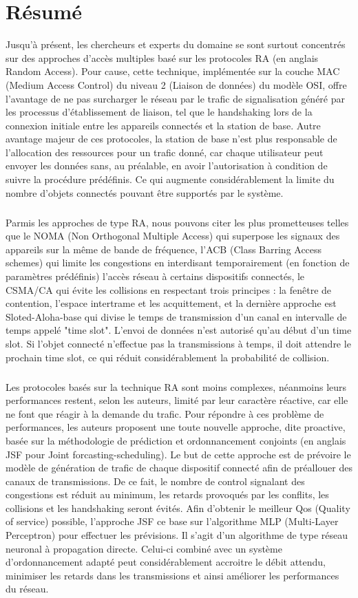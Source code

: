 \documentclass[12pt]{article}
\begin{document}
\section{Résumé}
Jusqu'à présent, les chercheurs et experts du domaine se sont surtout concentrés sur des approches d'accès multiples basé sur les protocoles RA (en anglais Random Access). 
Pour cause, cette technique, implémentée sur la couche MAC (Medium Access Control) du niveau 2 (Liaison de données) du modèle OSI, offre l'avantage de ne pas surcharger le réseau par le trafic de signalisation généré par les processus d'établissement de liaison, tel que le handshaking lors de la connexion initiale entre les appareils connectés et la station de base.
Autre avantage majeur de ces protocoles, la station de base n'est plus responsable de l'allocation des ressources pour un trafic donné, car chaque utilisateur peut envoyer les données sans, au préalable, en avoir l'autorisation à condition de suivre la procédure prédéfinis.
Ce qui augmente considérablement la limite du nombre d'objets connectés pouvant être supportés par le système.

\subparagraph{}Parmis les approches de type RA, nous pouvons citer les plus prometteuses telles que le NOMA (Non Orthogonal Multiple Access) qui superpose les signaux des appareils sur la même de bande de fréquence,
 l'ACB (Class Barring Access schemes) qui limite les congestions en interdisant temporairement (en fonction de paramètres prédéfinis) l'accès réseau à certains dispositifs connectés,
le CSMA/CA qui évite les collisions en respectant trois principes : la fenêtre de contention, l'espace intertrame et les acquittement, et la dernière approche est Sloted-Aloha-base qui divise le temps de transmission d'un canal en intervalle de temps appelé "time slot".
L'envoi de données n'est autorisé qu'au début d'un time slot. Si l'objet connecté n'effectue pas la transmissions à temps, il doit attendre le prochain time slot, ce qui réduit considérablement la probabilité de collision.
\subparagraph{}Les protocoles basés sur la technique RA sont moins complexes, néanmoins leurs performances restent, selon les auteurs, limité par leur caractère réactive, car elle ne font que réagir à la demande du trafic.
Pour répondre à ces problème de performances, les auteurs proposent une toute nouvelle approche, dite proactive, basée sur la méthodologie de prédiction et ordonnancement conjoints (en anglais JSF pour Joint forcasting-scheduling). 
Le but de cette approche  est de prévoire le modèle de génération de trafic de chaque dispositif connecté afin de préallouer des canaux de transmissions.
De ce fait, le nombre de control signalant des congestions est réduit au minimum, les retards provoqués par les conflits, les collisions et les handshaking seront évités.
Afin d'obtenir le meilleur Qos (Quality of service) possible, l'approche JSF ce base sur l'algorithme MLP (Multi-Layer Perceptron) pour effectuer les prévisions.
Il s'agit d'un algorithme de type réseau neuronal à propagation directe. Celui-ci combiné avec un système d'ordonnancement adapté peut considérablement accroitre le débit attendu, minimiser les retards dans les transmissions et ainsi améliorer les performances du réseau.
\end{document}

